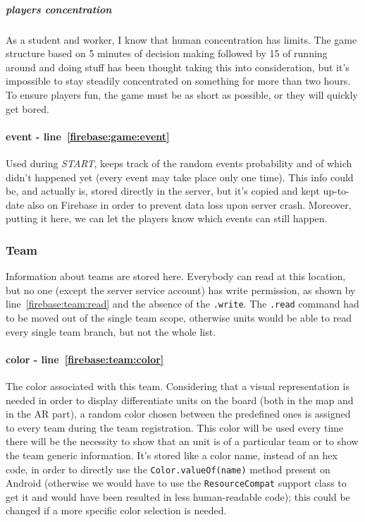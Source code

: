 				\subparagraph{players concentration}
				As a student and worker, I know that human concentration has limits. The game structure based on 5 minutes of decision making followed by 15 of running around and doing stuff has been thought taking this into consideration, but it's impossible to stay steadily concentrated on something for more than two hours.
				To ensure players fun, the game must be as short as possible, or they will quickly get bored.
				
				
				\paragraph{event - line~\ref{firebase:game:event}}
				Used during \emph{START}, keeps track of the random events probability and of which didn't happened yet (every event may take place only one time). This info could be, and actually is, stored directly in the server, but it's copied and kept up-to-date also on Firebase in order to prevent data loss upon server crash. Moreover, putting it here, we can let the players know which events can still happen.
			
			\subsubsection{Team}
			
				
				
				Information about teams are stored here.
				Everybody can read at this location, but no one (except the server service account) has write permission, as shown by line~\ref{firebase:team:read} and the absence of the \lstinline|.write|.
				The \lstinline|.read| command had to be moved out of the single team scope, otherwise units would be able to read every single team branch, but not the whole list. 
			
			
				\paragraph{color - line~\ref{firebase:team:color}}
				The color associated with this team. Considering that a visual representation is needed in order to display differentiate units on the board (both in the map and in the AR part), a random color chosen between the predefined ones is assigned to every team during the team registration. This color will be used every time there will be the necessity to show that an unit is of a particular team or to show the team generic information.
				It's stored like a color name, instead of an hex code, in order to directly use the \lstinline|Color.valueOf(name)| method present on Android (otherwise we would have to use the \lstinline|ResourceCompat| support class to get it and would have been resulted in less human-readable code); this could be changed if a more specific color selection is needed.
			
